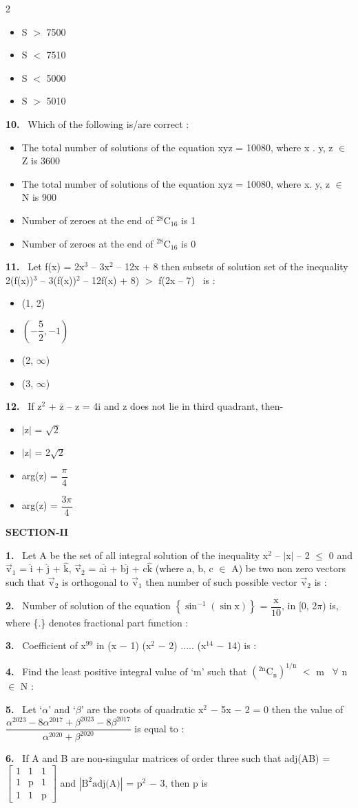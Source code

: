 \documentclass[10pt]{extarticle}
\newcommand{\sect}[1]{\par\smallskip\noindent\textbf{#1}\par}
\newcommand{\qn}[1]{\par\smallskip\noindent\textbf{#1.}~}
\newenvironment{qoptions}{\begin{itemize}[leftmargin=1.8em,itemsep=1pt,topsep=2pt,label={}]}{\end{itemize}}
\newcommand{\opt}[2]{\item[(#1)] #2}
\begin{document}
\begin{multicols}{2}
\begin{qoptions}
\opt{A}{S $>$ 7500}
\opt{B}{S $<$ 7510}
\opt{C}{S $<$ 5000}
\opt{D}{S $>$ 5010}
\end{qoptions}
\qn{10} Which of the following is/are correct :
\begin{qoptions}
\opt{A}{The total number of solutions of the equation xyz = 10080, where x . y, z $\in$ Z is 3600}
\opt{B}{The total number of solutions of the equation xyz = 10080, where x. y, z $\in$ N is 900}
\opt{C}{Number of zeroes at the end of $^{28}$C$_{16}$ is 1}
\opt{D}{Number of zeroes at the end of $^{28}$C$_{16}$ is 0}
\end{qoptions}
\qn{11} Let f(x) = 2x$^3$ -- 3x$^2$ -- 12x + 8 then subsets of solution set of the inequality 2(f(x))$^3$ -- 3(f(x))$^2$ -- 12f(x) + 8) $>$ f(2x -- 7) \ is :
\begin{qoptions}
\opt{A}{(1, 2)}
\opt{B}{$\left(-\dfrac{5}{2},-1\right)$}
\opt{C}{(2, $\infty$)}
\opt{D}{(3, $\infty$)}
\end{qoptions}
\qn{12} If z$^2$ + $\bar{\text{z}}$ -- z = 4i and z does not lie in third quadrant, then-
\begin{qoptions}
\opt{A}{$|$z$|$ = $\sqrt{2}$}
\opt{B}{$|$z$|$ = 2$\sqrt{2}$}
\opt{C}{arg(z) = $\dfrac{\pi}{4}$}
\opt{D}{arg(z) = $\dfrac{3\pi}{4}$}
\end{qoptions}
\sect{SECTION-II}
\qn{1} Let A be the set of all integral solution of the inequality x$^2$ -- $|$x$|$ -- 2 $\leq$ 0 and $\vec{\text{v}}_1$ = $\hat{\text{i}}$ + $\hat{\text{j}}$ + $\hat{\text{k}}$, $\vec{\text{v}}_2$ = a$\hat{\text{i}}$ + b$\hat{\text{j}}$ + c$\hat{\text{k}}$ (where a, b, c $\in$ A) be two non zero vectors such that $\vec{\text{v}}_2$ is orthogonal to $\vec{\text{v}}_1$ then number of such possible vector $\vec{\text{v}}_2$ is :
\qn{2} Number of solution of the equation $\left\{\sin^{-1}(\sin\text{x})\right\}$ = $\dfrac{\text{x}}{10}$, in [0, 2$\pi$) is, where \{.\} denotes fractional part function :
\qn{3} Coefficient of x$^{99}$ in (x $-$ 1) (x$^2$ $-$ 2) ..... (x$^{14}$ $-$ 14) is :
\qn{4} Find the least positive integral value of `m' such that $\left({}^{2\text{n}}\text{C}_\text{n}\right)^{1/\text{n}}$ $<$ m \ $\forall$ n $\in$ N :
\qn{5} Let `$\alpha$' and `$\beta$' are the roots of quadratic x$^2$ $-$ 5x $-$ 2 = 0 then the value of $\dfrac{\alpha^{2023}-8\alpha^{2017}+\beta^{2023}-8\beta^{2017}}{\alpha^{2020}+\beta^{2020}}$ is equal to :
\qn{6} If A and B are non-singular matrices of order three such that adj(AB) = $\begin{bmatrix}1&1&1\\1&\text{p}&1\\1&1&\text{p}\end{bmatrix}$ and $|\text{B}^2\text{adj(A)}|$ = p$^2$ $-$ 3, then p is

\end{multicols}
\end{document}
